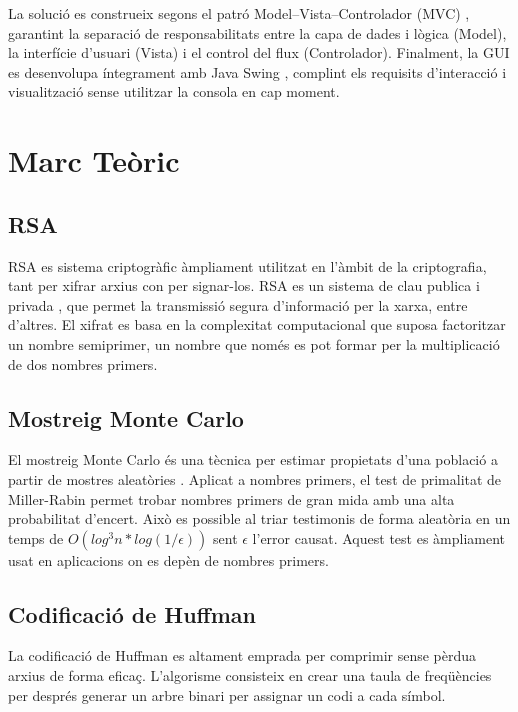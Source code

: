 \documentclass{ieeetj}
\begin{document}
La solució es construeix segons el patró Model–Vista–Controlador (MVC) \cite{gamma1994}, garantint la separació de responsabilitats entre la capa de dades i lògica (Model), la interfície d’usuari (Vista) i el control del flux (Controlador). \newline
Finalment, la GUI es desenvolupa íntegrament amb Java Swing \cite{gafter1999}, complint els requisits d’interacció i visualització sense utilitzar la consola en cap moment.

\section{Marc Teòric}
\subsection{RSA}
RSA es sistema criptogràfic\cite{RSA} àmpliament utilitzat en l'àmbit de la criptografia, tant per xifrar arxius con per signar-los. RSA es un sistema de clau publica i privada \cite{pubkey}, que permet la transmissió segura d'informació per la xarxa, entre d'altres. El xifrat es basa en la complexitat computacional que suposa factoritzar un nombre semiprimer, un nombre que només es pot formar per la multiplicació de dos nombres primers.

\subsection{Mostreig Monte Carlo}
El mostreig Monte Carlo és una tècnica per estimar propietats d’una població a partir de mostres aleatòries \cite{hammersley1964}. Aplicat a nombres primers, el test de primalitat de Miller-Rabin \cite{miller} permet trobar nombres primers de gran mida amb una alta probabilitat d'encert. Això es possible al triar testimonis de forma aleatòria en un temps de \(O(log^3n*log(1/\epsilon))\) sent \(\epsilon\) l'error causat. Aquest test es àmpliament usat en aplicacions on es depèn de nombres primers.



\subsection{Codificació de Huffman}
La codificació de Huffman \cite{huffman1952} es altament emprada per comprimir sense pèrdua arxius de forma eficaç.
L'algorisme consisteix en crear una taula de freqüències per després generar un arbre binari per assignar un codi a cada símbol.
\end{document}
